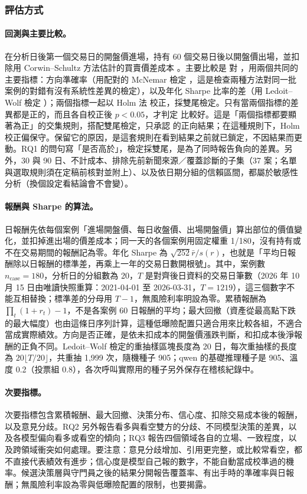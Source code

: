 \subsubsection{評估方式}

\paragraph{回測與主要比較。} 在分析日後第一個交易日的開盤價進場，持有 60 個交易日後以開盤價出場，並扣除用 Corwin--Schultz 方法估計的買賣價差成本 \citep{corwin2012spread}。主要比較是  對 ，用兩個共同的主要指標：方向準確率（用配對的 McNemar 檢定 \citep{mcnemar1947}，這是檢查兩種方法對同一批案例的對錯有沒有系統性差異的檢定），以及年化 Sharpe 比率的差（用 Ledoit--Wolf 檢定 \citep{ledoit2008sharpe}）；兩個指標一起以 Holm 法 \citep{holm1979} 校正，採雙尾檢定。只有當兩個指標的差異都是正的，而且各自校正後 $p<0.05$，才判定  比較好。這是「兩個指標都要顯著為正」的交集規則，搭配雙尾檢定，只承認  的正向結果；在這種規則下，Holm 校正偏保守。保留它的原因，是這套規則在看到結果之前就已鎖定，不因結果而更動。RQ1 的問句寫「是否高於」，檢定採雙尾，是為了同時報告負向的差異。另外，30 與 90 日、不計成本、排除先前新聞來源／覆蓋診斷的子集（37 案；名單與選取規則須在定稿前核對並附上）、以及依日期分組的信賴區間，都屬於敏感性分析（換個設定看結論會不會變）。

\paragraph{報酬與 Sharpe 的算法。} 日報酬先依每個案例「進場開盤價、每日收盤價、出場開盤價」算出部位的價值變化，並扣掉進出場的價差成本；同一天的各個案例用固定權重 1/180，沒有持有或不在交易期間的報酬記為零。年化 Sharpe 為 $\sqrt{252}\bar r/s(r)$，也就是「平均日報酬除以日報酬的標準差，再乘上一年的交易日數開根號」。其中，案例數 $n_{\mathrm{case}}=180$，分析日的分組數為 20，$T$ 是對齊後日資料的交易日筆數（2026 年 10 月 15 日由唯讀快照重算：2021-04-01 至 2026-03-31，$T=1219$），這三個數字不能互相替換；標準差的分母用 $T-1$，無風險利率明設為零。累積報酬為 $\prod_t(1+r_t)-1$，不是各案例 60 日報酬的平均；最大回撤（資產從最高點下跌的最大幅度）也由這條日序列計算，這種低曝險配置只適合用來比較各組，不適合當成實際績效。方向是否正確，是依未扣成本的開盤價漲跌判斷，和扣成本後淨報酬的正負不同。Ledoit--Wolf 檢定的重抽樣區塊長度為 20 日，每次重抽樣的長度為 $20\lfloor T/20\rfloor$，共重抽 1,999 次，隨機種子 905；qwen 的基礎推理種子是 905、溫度 0.2（投票組 0.8），各次呼叫實際用的種子另外保存在稽核紀錄中。

\paragraph{次要指標。} 次要指標包含累積報酬、最大回撤、決策分布、信心度、扣除交易成本後的報酬，以及意見分歧。RQ2 另外報告看多與看空雙方的分歧、不同模型決策的差異，以及各模型偏向看多或看空的傾向；RQ3 報告四個領域各自的立場、一致程度，以及跨領域衝突如何處理。要注意：意見分歧增加、引用更完整，或比較常看空，都不直接代表績效有進步；信心度是模型自己報的數字，不能自動當成校準過的機率。候選決策層與守門員之後的結果分開報告覆蓋率、有出手時的準確率與日報酬；無風險利率設為零與低曝險配置的限制，也要揭露。

